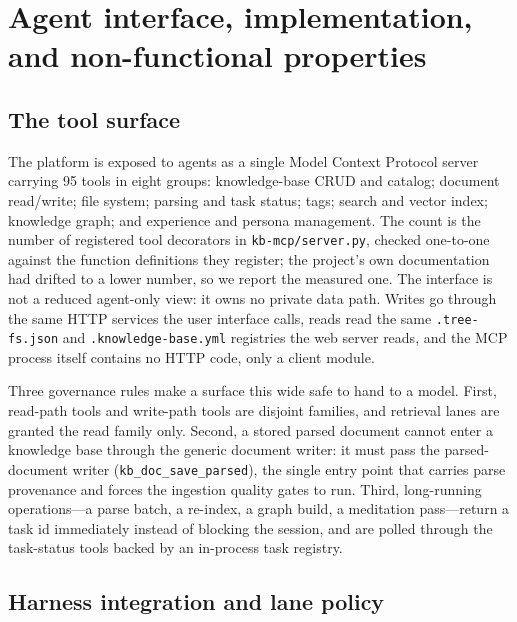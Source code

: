 \section{Agent interface, implementation, and non-functional properties}
\label{sec:implementation}
\label{sec:impl}

\subsection{The tool surface}
\label{sec:impl-tools}

The platform is exposed to agents as a single Model Context Protocol
server~\cite{mcp} carrying 95 tools in eight groups: knowledge-base CRUD and
catalog; document read/write; file system; parsing and task status; tags;
search and vector index; knowledge graph; and experience and persona
management. The count is the number of registered tool decorators in
\texttt{kb-mcp/server.py}, checked one-to-one against the function
definitions they register; the project's own documentation had drifted to a
lower number, so we report the measured one. The interface is not a reduced
agent-only view: it owns no private data path. Writes go through the same
HTTP services the user interface calls, reads read the same
\texttt{.tree-fs.json} and \texttt{.knowledge-base.yml} registries the web
server reads, and the MCP process itself contains no HTTP code, only a
client module.

Three governance rules make a surface this wide safe to hand to a model.
First, read-path tools and write-path tools are disjoint families, and
retrieval lanes are granted the read family only. Second, a stored parsed
document cannot enter a knowledge base through the generic document writer:
it must pass the parsed-document writer (\texttt{kb\_doc\_save\_parsed}),
the single entry point that carries parse provenance and forces the
ingestion quality gates to run. Third, long-running operations---a parse
batch, a re-index, a graph build, a meditation pass---return a task id
immediately instead of blocking the session, and are polled through the
task-status tools backed by an in-process task registry.

\subsection{Harness integration and lane policy}
\label{sec:impl-harness}

